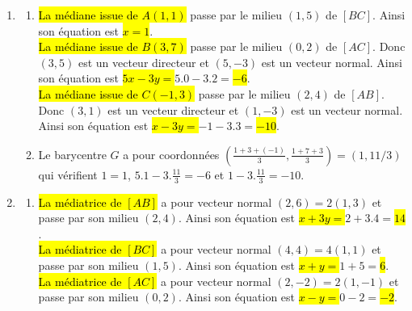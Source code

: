 \documentclass[a4paper,12pt,reqno]{amsart}
\begin{document}
\begin{solution}

  \begin{enumerate}
    \item
      \begin{enumerate}
        \item \hl{La médiane issue de $A(1,1)$} passe par le milieu $(1,5)$ de $[BC]$. Ainsi son équation est \hl{$x=1$}.\\
        \hl{La médiane issue de $B(3,7)$} passe par le milieu $(0,2)$ de $[AC]$. Donc $(3,5)$ est un vecteur directeur et $(5,-3)$ est un vecteur normal. Ainsi son équation est \hl{$5x-3y=$}$5.0-3.2=$\hl{$-6$}.\\
        \hl{La médiane issue de $C(-1,3)$} passe par le milieu $(2,4)$ de $[AB]$. Donc $(3,1)$ est un vecteur directeur et $(1,-3)$ est un vecteur normal. Ainsi son équation est \hl{$x-3y=$}$-1-3.3=$\hl{$-10$}.
        \item Le barycentre $G$ a pour coordonnées $(\frac{1+3+(-1)}{3}, \frac{1+7+3}{3})=(1, 11/3)$ qui vérifient $1=1$, $5.1-3.\frac{11}{3}=-6$ et $1-3.\frac{11}{3}=-10$.
      \end{enumerate}
    \item
      \begin{enumerate}
        \item
        \hl{La médiatrice de $[AB]$} a pour vecteur normal $(2,6)=2(1,3)$ et passe par son milieu $(2,4)$. Ainsi son équation est \hl{$x+3y=$}$2+3.4=$\hl{$14$}.\\
        \hl{La médiatrice de $[BC]$} a pour vecteur normal $(4,4)=4(1,1)$ et passe par son milieu $(1,5)$. Ainsi son équation est \hl{$x+y=$}$1+5=$\hl{$6$}.\\
        \hl{La médiatrice de $[AC]$} a pour vecteur normal $(2,-2)=2(1,-1)$ et passe par son milieu $(0,2)$. Ainsi son équation est \hl{$x-y=$}$0-2=$\hl{$-2$}.


\end{enumerate}
\end{enumerate}
\end{solution}
\end{document}
